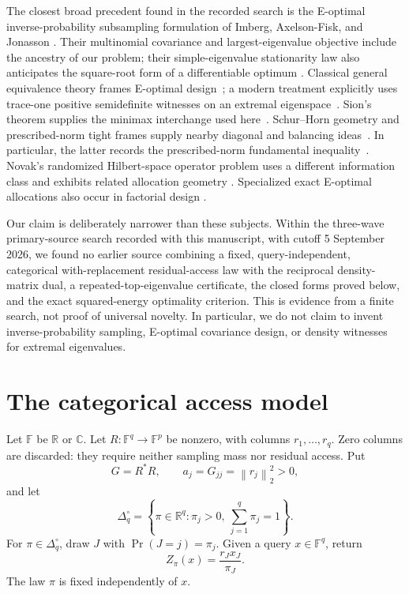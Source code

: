 \documentclass[11pt]{article}
\theoremstyle{definition}
\newcommand{\F}{\mathbb F}
\newcommand{\norm}[1]{\left\lVert #1\right\rVert}
\begin{document}
The closest broad precedent found in the recorded search is the E-optimal inverse-probability
subsampling formulation of Imberg, Axelson-Fisk, and Jonasson
\cite[eqs.~(8)--(9), Table~1]{ImbergEtAl2023}.  Their multinomial covariance and
largest-eigenvalue objective include the ancestry of our problem; their simple-eigenvalue
stationarity law also anticipates the square-root form of a differentiable optimum
\cite[Lemma~2(c), Proposition~1, eq.~(13)]{ImbergEtAl2023}.  Classical general equivalence theory
frames E-optimal design~\cite{Kiefer1974}; a modern treatment explicitly uses trace-one positive
semidefinite witnesses on an extremal eigenspace~\cite[\S2]{HarmanRosa2018}.  Sion's theorem supplies the minimax interchange used
here~\cite{Sion1958}.  Schur--Horn geometry and prescribed-norm tight frames supply nearby
diagonal and balancing ideas~\cite{Horn1954,CasazzaEtAl2006}.  In particular, the latter records
the prescribed-norm fundamental inequality~\cite[Proposition~1]{CasazzaEtAl2006}.  Novak's
randomized Hilbert-space operator problem uses a different information class and exhibits related allocation geometry
\cite{Novak1992}.  Specialized exact E-optimal allocations also occur in factorial design
\cite[Theorem~1]{RavichandranEtAl2024}.

Our claim is deliberately narrower than these subjects.  Within the three-wave primary-source
search recorded with this manuscript, with cutoff 5 September 2026, we found no earlier source
combining a fixed, query-independent, categorical with-replacement residual-access law with the
reciprocal density-matrix dual, a repeated-top-eigenvalue certificate, the closed forms proved
below, and the exact squared-energy optimality criterion.  This is evidence from a finite search,
not proof of universal novelty.  In particular, we do not claim to invent inverse-probability
sampling, E-optimal covariance design, or density witnesses for extremal eigenvalues.

\section{The categorical access model}

Let $\F$ be $\mathbb R$ or $\mathbb C$.  Let
$R:\F^q\to\F^p$ be nonzero, with columns $r_1,\ldots,r_q$.  Zero columns are discarded: they
require neither sampling mass nor residual access.  Put
\[
  G=R^*R,\qquad a_j=G_{jj}=\norm{r_j}_2^2>0,
\]
and let
\[
  \Delta_q^\circ=\left\{\pi\in\mathbb R^q:
  \pi_j>0,\ \sum_{j=1}^q\pi_j=1\right\}.
\]
For $\pi\in\Delta_q^\circ$, draw $J$ with $\Pr(J=j)=\pi_j$.  Given a query
$x\in\F^q$, return
\begin{equation}
  Z_\pi(x)=\frac{r_Jx_J}{\pi_J}.
  \label{eq:estimator}
\end{equation}
The law $\pi$ is fixed independently of $x$.
\end{document}
